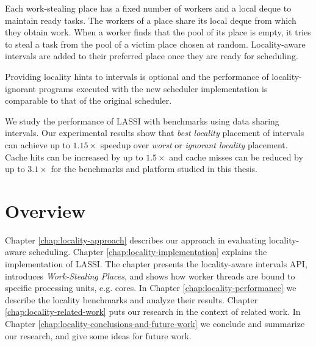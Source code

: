 Each work-stealing place has a fixed number of workers and a local
deque to maintain ready tasks. The workers of a place share its local
deque from which they obtain work. When a worker finds that the pool
of its place is empty, it tries to steal a task from the pool of a
victim place chosen at random. Locality-aware intervals are added to
their preferred place once they are ready for scheduling.

Providing locality hints to intervals is optional and the performance
of locality-ignorant programs executed with the new scheduler
implementation is comparable to that of the original scheduler.

We study the performance of LASSI with benchmarks using data sharing
intervals. Our experimental results show that \emph{best locality}
placement of intervals can achieve up to $1.15\times$ speedup over
\emph{worst} or \emph{ignorant locality} placement. Cache hits can be
increased by up to $1.5\times$ and cache misses can be reduced by up
to $3.1\times$ for the benchmarks and platform studied in this thesis.


\section{Overview}
\label{sec:locality-introduction-locality-overview}

Chapter \ref{chap:locality-approach} describes our approach in
evaluating locality-aware scheduling. Chapter
\ref{chap:locality-implementation} explains the implementation of
LASSI. The chapter presents the locality-aware intervals API,
introduces \emph{Work-Stealing Places}, and shows how worker threads
are bound to specific processing units, e.g. cores.  In Chapter
\ref{chap:locality-performance} we describe the locality benchmarks
and analyze their results. Chapter \ref{chap:locality-related-work}
puts our research in the context of related work. In Chapter
\ref{chap:locality-conclusions-and-future-work} we conclude and
summarize our research, and give some ideas for future work.


